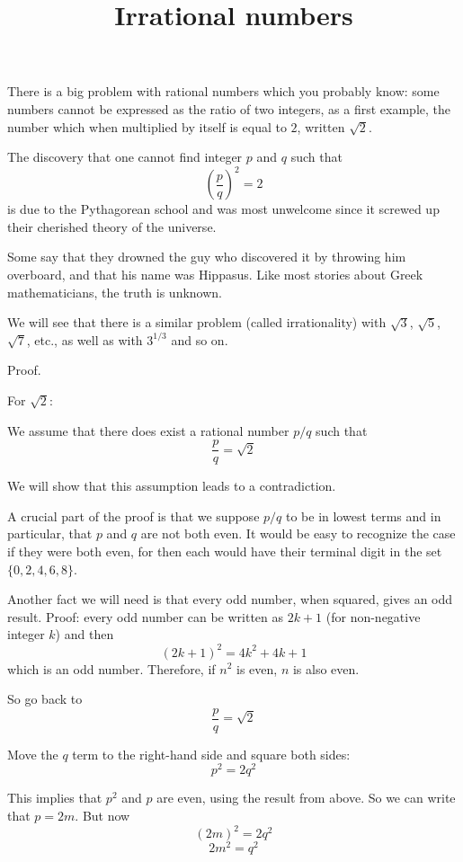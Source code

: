 \documentclass[11pt, oneside]{article}
\title{Irrational numbers}
\date{}
\begin{document}
\maketitle
\Large


There is a big problem with rational numbers which you probably know:  some numbers cannot be expressed as the ratio of two integers, as a first example, the number which when multiplied by itself is equal to $2$, written $\sqrt{2}$.  

The discovery that one cannot find integer $p$ and $q$ such that
\[ (\frac{p}{q})^2 = 2 \]
is due to the Pythagorean school and was most unwelcome since it screwed up their cherished theory of the universe.  

Some say that they drowned the guy who discovered it by throwing him overboard, and that his name was Hippasus.  Like most stories about Greek mathematicians, the truth is unknown.

We will see that there is a similar problem (called irrationality) with $\sqrt{3}$, $\sqrt{5}$, $\sqrt{7}$, etc., as well as with $3^{1/3}$ and so on.

Proof.

For $\sqrt{2}$:

We assume that there does exist a rational number $p/q$ such that
\[ \frac{p}{q} = \sqrt{2}  \]

We will show that this assumption leads to a contradiction.

A crucial part of the proof is that we suppose $p/q$ to be in lowest terms and in particular, that $p$ and $q$ are not both even.  It would be easy to recognize the case if they were both even, for then each would have their terminal digit in the set $\{ 0, 2, 4, 6, 8 \}$.

Another fact we will need is that every odd number, when squared, gives an odd result.  Proof:  every odd number can be written as $2k+1$ (for non-negative integer $k$) and then
\[ (2k+1)^2 = 4k^2 + 4k + 1 \]
which is an odd number.  Therefore, if $n^2$ is even, $n$ is also even.

So go back to 
\[ \frac{p}{q} = \sqrt{2}  \]

Move the $q$ term to the right-hand side and square both sides:
\[ p^2 = 2q^2 \]

This implies that $p^2$ and $p$ are even, using the result from above.   So we can write that $p = 2m$. But now
\[ (2m)^2 = 2q^2 \]
\[ 2m^2 = q^2 \]
\end{document}
